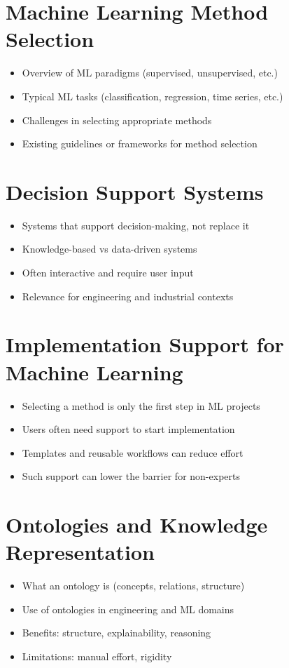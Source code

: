 \section{Machine Learning Method Selection}
\begin{itemize}
    \item Overview of ML paradigms (supervised, unsupervised, etc.)
    \item Typical ML tasks (classification, regression, time series, etc.)
    \item Challenges in selecting appropriate methods
    \item Existing guidelines or frameworks for method selection
\end{itemize}

\section{Decision Support Systems}
\begin{itemize}
    \item Systems that support decision-making, not replace it
    \item Knowledge-based vs data-driven systems
    \item Often interactive and require user input
    \item Relevance for engineering and industrial contexts
\end{itemize}

\section{Implementation Support for Machine Learning}
\begin{itemize}
    \item Selecting a method is only the first step in ML projects
    \item Users often need support to start implementation
    \item Templates and reusable workflows can reduce effort
    \item Such support can lower the barrier for non-experts
\end{itemize}

\section{Ontologies and Knowledge Representation}
\begin{itemize}
    \item What an ontology is (concepts, relations, structure)
    \item Use of ontologies in engineering and ML domains
    \item Benefits: structure, explainability, reasoning
    \item Limitations: manual effort, rigidity
\end{itemize}


